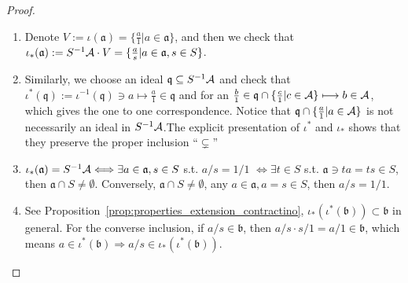 \documentclass[11pt]{article}
\newcommand{\sca}{{\mathfrak a}}
\newcommand{\scb}{{\mathfrak b}}
\newcommand{\scq}{\mathfrak q}
\newcommand{\cala}{{\cal A}}
\newcommand{\Lrta}{\Longrightarrow}
\newcommand{\Llrta}{\Longleftrightarrow}
\begin{document}
\begin{proof}\ 
\begin{enumerate}[label=(\alph*)]
\item 
 Denote $V:=\iota(\sca)=\{\frac{a}{1}|a\in\sca\}$, and then we check that $\iota_*(\sca):=S^{-1}\cala\cdot V=\{\frac{a}{s}|a\in\sca,s\in S\}$. 
\item 
 Similarly, we choose an ideal $\scq\subseteq S^{-1}\cala$ and check that $\iota^*(\scq):=\iota^{-1}(\scq)\ni a\longmapsto \frac{a}{1}\in\scq$ and for an $\frac{b}{1}\in\scq\cap\{\frac{c}{1}|c\in\cala\}\longmapsto b\in\cala$, which gives the one to one correspondence. {\color{red} Notice that $\scq\cap\{\frac{a}{1}|a\in\cala\}$ is not necessarily an ideal in $S^{-1}\cala$.The explicit presentation of $\iota^*$ and $\iota_*$ shows that they preserve the proper inclusion ``$\subsetneq$''}
\item
 $\iota_*(\sca)=S^{-1}\cala\Llrta \exists a\in \sca, s\in S$ s.t. $a/s=1/1$
$\Llrta\exists t\in S$ s.t. $\sca\ni ta=ts\in S$, then $\sca\cap S\neq\emptyset$. Conversely, $\sca\cap S\neq \emptyset$, any $a\in \sca, a=s\in S$, then $a/s=1/1$. 
\item 
See Proposition~\ref{prop:properties_extension_contractino}, $\iota_*(\iota^*(\scb))\subset \scb$ in general. For the converse inclusion, if $a/s\in \scb$, then $a/s\cdot s/1=a/1\in\scb$, which means $a\in \iota^{*}(\scb)\Lrta a/s\in \iota_{*}(\iota^*(\scb))$. 
\end{enumerate} 
\end{proof}
\end{document}
